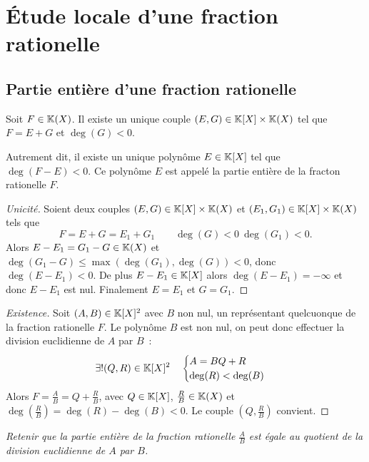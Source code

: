 \section{Étude locale d'une fraction rationelle}

\subsection{Partie entière d'une fraction rationelle}

\begin{theo}
  Soit \(F \in \mathbb{K}(X)\). Il existe un unique couple \((E,G) \in \mathbb{K}[X]\times\mathbb{K}(X)\) tel que \(F=E+G\) et \(\deg(G)<0\).

  Autrement dit, il existe un unique polynôme \(E \in \mathbb{K}[X]\) tel que \(\deg(F-E)<0\). Ce polynôme \(E\) est appelé la partie entière de la fracton rationelle \(F\).
\end{theo}
\begin{proof}[Unicité]
  Soient deux couples \((E,G) \in \mathbb{K}[X]\times\mathbb{K}(X)\) et \((E_1,G_1) \in \mathbb{K}[X]\times\mathbb{K}(X)\) tels que
  \begin{equation}
    F=E+G=E_1+G_1 \qquad \deg(G)<0 \ \deg(G_1)<0.
  \end{equation}
  Alors \(E-E_1=G_1-G \in \mathbb{K}(X)\) et \(\deg(G_1-G)\leqslant \max(\deg(G_1),\deg(G))<0\), donc \(\deg(E-E_1)<0\). De plus \(E-E_1 \in \mathbb{K}[X]\) alors \(\deg(E-E_1)=-\infty\) et donc \(E-E_1\) est nul. Finalement \(E=E_1\) et \(G=G_1\).
\end{proof}
\begin{proof}[Existence]
  Soit \((A,B) \in \mathbb{K}[X]^2\) avec \(B\) non nul, un représentant quelcuonque de la fraction rationelle \(F\). Le polynôme \(B\) est non nul, on peut donc effectuer la division euclidienne de \(A\) par \(B\)~:
  \begin{equation}
    \exists! (Q,R) \in \mathbb{K}[X]^2 \quad \begin{cases} A=BQ+R \\ \deg(R) < \deg(B) \end{cases}
  \end{equation}
  Alors \(F=\frac{A}{B}=Q+\frac{R}{B}\), avec \(Q \in \mathbb{K}[X]\), \(\frac{R}{B} \in \mathbb{K}(X)\) et \(\deg\left(\frac{R}{B}\right)=\deg(R)-\deg(B)<0\). Le couple \((Q,\frac{R}{B})\) convient.
\end{proof}

\emph{Retenir que la partie entière de la fraction rationelle \(\frac{A}{B}\) est égale au quotient de la division euclidienne de \(A\) par \(B\).}

